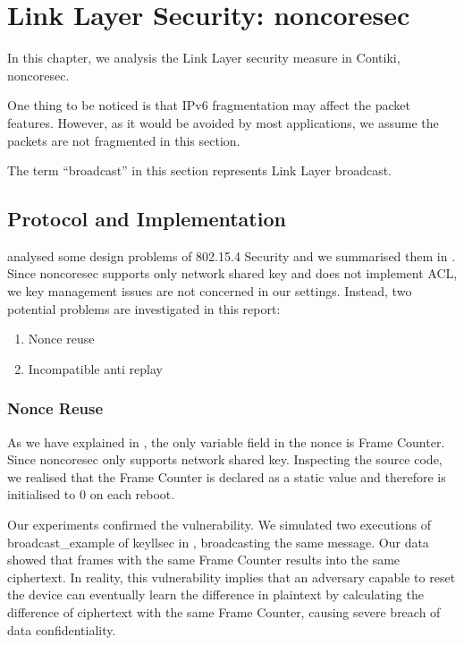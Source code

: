 \chapter{Link Layer Security: noncoresec} \label{Chp: LLSEC}

In this chapter, we analysis the Link Layer security measure in Contiki, noncoresec.

One thing to be noticed is that IPv6 fragmentation may affect the packet features. However, as it would be avoided by most applications, we assume the packets are not fragmented in this section.

The term ``broadcast'' in this section represents Link Layer broadcast.

\section{Protocol and Implementation}

\cite{802154sec} analysed some design problems of 802.15.4 Security and  we summarised them in . Since noncoresec supports only network shared key and does not implement ACL, we key management issues are not concerned in our settings. Instead, two potential problems are investigated in this report:

\begin{enumerate}
	\item Nonce reuse
	\item Incompatible anti replay
\end{enumerate}

\subsection{Nonce Reuse}

As we have explained in , the only variable field in the nonce is Frame Counter. Since noncoresec only supports network shared key. Inspecting the source code, we realised that the Frame Counter is declared as a static value and therefore is initialised to $0$ on each reboot.

Our experiments confirmed the vulnerability. We simulated two executions of  broadcast\_example of keyllsec in , broadcasting the same message. Our data\cite{NonceReuseData} showed that frames with the same Frame Counter results into the same ciphertext. In reality, this vulnerability implies that an adversary capable to reset the device can eventually learn the difference in plaintext by calculating the difference of ciphertext with the same Frame Counter, causing severe breach of data confidentiality.

